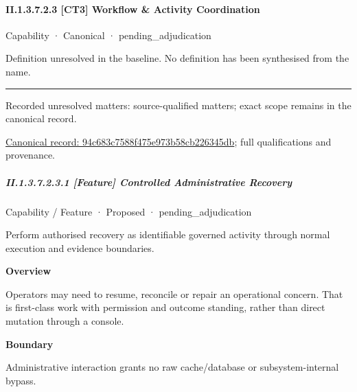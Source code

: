 \paragraph*{II.1.3.7.2.3 [CT3] Workflow \& Activity Coordination}
\label{navigation:II.1.3.7.2.3}

\label{element:94c683c7588f475e973b58cb226345db}
{\small Capability · Canonical · pending\_adjudication}\par

Definition unresolved in the baseline. No definition has been synthesised from the name.



\medskip\hrule\medskip

{\small Recorded unresolved matters: source-qualified matters; exact scope remains in the canonical record.}\par
{\footnotesize \href{../../../../../../../continuum/strategy/capability/94c683c7588f475e973b58cb226345db.md}{Canonical record: 94c683c7588f475e973b58cb226345db}; full qualifications and provenance.}\par
\subparagraph*{II.1.3.7.2.3.1 [Feature] Controlled Administrative Recovery}
\label{navigation:II.1.3.7.2.3.1}

\label{element:21d0601a852043a4b0b1d4fe841108d2}
{\small Capability / Feature · Proposed · pending\_adjudication}\par

Perform authorised recovery as identifiable governed activity through normal execution and evidence boundaries.



\textbf{Overview}



Operators may need to resume, reconcile or repair an operational concern. That is first-class work with permission and outcome standing, rather than direct mutation through a console.



\textbf{Boundary}



Administrative interaction grants no raw cache/database or subsystem-internal bypass.


